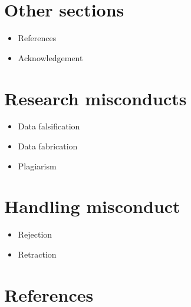 \documentclass[
  letterpaper,
  DIV=11,
  numbers=noendperiod]{scrreprt}
\newlength{\cslhangindent}
\newenvironment{CSLReferences}[2] %
 {\begin{list}{}{%
  \setlength{\itemindent}{0pt}
  \setlength{\leftmargin}{0pt}
  \setlength{\parsep}{0pt}
  \ifodd #1
   \setlength{\leftmargin}{\cslhangindent}
   \setlength{\itemindent}{-1\cslhangindent}
  \fi
  \setlength{\itemsep}{#2\baselineskip}}}
 {\end{list}}
\begin{document}

\chapter{Other sections}\label{other-sections}

\begin{itemize}
\item
  References
\item
  Acknowledgement
\end{itemize}


\chapter{Research misconducts}\label{research-misconducts}

\begin{itemize}
\item
  Data falsification
\item
  Data fabrication
\item
  Plagiarism
\end{itemize}


\chapter{Handling misconduct}\label{handling-misconduct}

\begin{itemize}
\item
  Rejection
\item
  Retraction
\end{itemize}


\chapter*{References}\label{references}


\label{refs}
\begin{CSLReferences}{0}{1}
\end{CSLReferences}
\end{document}
